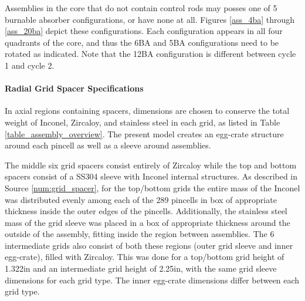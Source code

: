 Assemblies in the core that do not contain control rods may posses one of 5
burnable absorber configurations, or have none at all. Figures \ref{ass_4ba}
through \ref{ass_20ba} depict these configurations. Each configuration appears
in all four quadrants of the core, and thus the 6BA and 5BA configurations need
to be rotated as indicated. Note that the 12BA configuration is different
between cycle 1 and cycle 2.


\FloatBarrier
\paragraph[Radial Grid Spacer Specifications]{Radial Grid Spacer Specifications\texorpdfstring{\protect{}}{}}
\label{sec:rad_grids}

In axial regions containing spacers, dimensions are chosen to conserve the total
weight of Inconel, Zircaloy, and stainless steel in each grid, as listed in
Table \ref{table_assembly_overview}. The present model creates an egg-crate
structure around each pincell as well as a sleeve around assemblies.

The middle six grid spacers consist entirely of Zircaloy while the top and bottom
spacers consist of a \ac{SS304} sleeve with Inconel internal structures. As described
in Source \ref{num:grid_spacer}, for the top/bottom grids the entire mass of the
Inconel was distributed evenly among each of the 289 pincells in box of
appropriate thickness inside the outer edges of the pincells. Additionally, the
stainless steel mass of the grid sleeve was placed in a box of
appropriate thickness around the outside of the assembly, fitting inside the
region between assemblies. The 6 intermediate grids also consist of both
these regions (outer grid sleeve and inner egg-crate), filled with Zircaloy.
This was done for a top/bottom grid height of 1.322in and an intermediate grid
height of 2.25in, with the same grid sleeve dimensions for each grid type.  The
inner egg-crate dimensions differ between each grid type.

